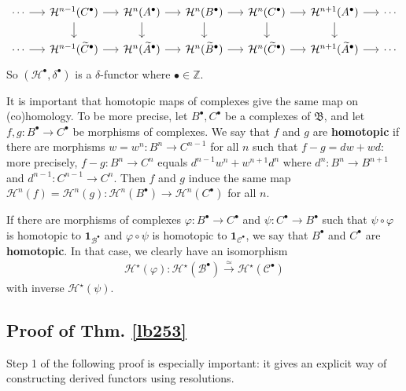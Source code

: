 \documentclass[12pt,b5paper,notitlepage]{report}
\theoremstyle{definition}
\theoremstyle{plain}
\newcommand{\fk}{\mathfrak}
\newcommand{\mc}{\mathcal}
\newcommand{\wtd}{\widetilde}
\newcommand{\id}{\mathbf{1}}
\newcommand{\blt}{\bullet}
\newcommand{\Zbb}{\mathbb Z}
\numberwithin{equation}{section}
\begin{document}
\begin{equation}
\begin{tikzcd}[row sep=0.2in, column sep=0.2in]
\cdots \arrow[r] & \mc H^{n-1}(C^\blt) \arrow[r] \arrow[d] & \mc H^n(A^\blt) \arrow[r] \arrow[d] & \mc H^n(B^\blt) \arrow[r] \arrow[d] & \mc H^n(C^\blt) \arrow[r] \arrow[d] & \mc H^{n+1}(A^\blt) \arrow[r] \arrow[d] & \cdots \\
\cdots \arrow[r] & \mc H^{n-1}(\wtd C^\blt) \arrow[r]           & \mc H^n(\wtd A^\blt) \arrow[r]           & \mc H^n(\wtd B^\blt) \arrow[r]           & \mc H^n(\wtd C^\blt) \arrow[r]           & \mc H^{n+1}(\wtd A^\blt)\arrow[r]           & \cdots
\end{tikzcd}
\end{equation}
So $(\mc H^\blt,\delta^\blt)$ is a $\delta$-functor where $\blt\in\Zbb$.


It is important that homotopic maps of complexes give the same map on (co)homology. To be more precise, let $B^\blt,C^\blt$ be a complexes of $\fk B$, and let $f,g:B^\blt\rightarrow C^\blt$ be morphisms of complexes. We say that $f$ and $g$ are \textbf{homotopic}  if there are morphisms $w=w^n:B^n\rightarrow C^{n-1}$ for all $n$ such that $f-g=dw+wd$: more precisely, $f-g:B^n\rightarrow C^n$ equals $d^{n-1}w^n+w^{n+1}d^n$ where $d^n:B^n\rightarrow B^{n+1}$ and $d^{n-1}:C^{n-1}\rightarrow C^n$. Then $f$ and $g$ induce the same map $\mc H^n(f)=\mc H^n(g):\mc H^n(B^\blt)\rightarrow \mc H^n(C^\blt)$ for all $n$.

If there are morphisms of complexes $\varphi:B^\blt\rightarrow C^\blt$ and $\psi:C^\blt\rightarrow B^\blt$ such that $\psi\circ\varphi$ is homotopic to $\id_{\mc B^\blt}$ and $\varphi\circ\psi$ is homotopic to $\id_{\mc C^\blt}$, we say that $B^\blt$ and $C^\blt$ are \textbf{homotopic}.  In that case, we clearly have an isomorphism
\begin{align*}
\mc H^\star(\varphi):\mc H^\star(\mc B^\blt)\xrightarrow{\simeq} \mc H^\star(\mc C^\blt)
\end{align*}
with inverse $\mc H^\star(\psi)$.




\subsection{Proof of Thm. \ref{lb253}}  \label{lb256}

Step 1 of the following proof is especially important: it gives an explicit way of constructing derived functors using resolutions.
\end{document}
